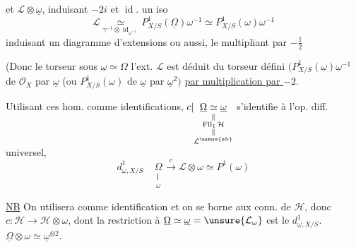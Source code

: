 et $\mathcal{L}\otimes\underline{\omega}$, induisant $-2i$ et $\operatorname{id}$.  un iso
\[
\mathcal{L}\underset{\gamma^{-1}\otimes\operatorname{id}_{\omega^{-1}}}{\simeq}P^1_{X/S}(\underline{\Omega})\omega^{-1}\simeq P^1_{X/S}(\omega)\omega^{-1}
\]
induisant un diagramme d'extensions
\margin{\textcircled{$\alpha$}}
ou aussi, le multipliant par $-\frac12$

(Donc le torseur sous $\underline{\omega}\simeq\Omega$  l'ext. $\mathcal{L}$ est déduit du torseur  défini  $(P^1_{X/S}(\underline{\omega})\underline{\omega}^{-1}$ de $\mathcal{O}_X$ par $\underline{\omega}$ (ou $P^1_{X/S}(\omega)$ de $\underline{\omega}$ par $\underline{\omega}^2)$ \uline{par multiplication par $-2$}.

Utilisant ces hom. comme identifications,
$c|\underset{\substack{\Vert\\\operatorname{Fil}_1\mathcal{H}\\\Vert\\\mathcal{L}^{\unsure{\mathrm{ab}}}}}{\underline{\Omega}\simeq\underline{\omega}}$ s'identifie à l'op. diff. universel,
\[
d^1_{\underline{\omega},X/S}\quad
\underset{\substack{\Vert\\\omega}}{\Omega}\xrightarrow{c}\mathcal{L}\otimes\omega\simeq P^1(\omega)
\]

\uline{NB} On utilisera  comme identification et on se borne aux conn. de $\mathcal{H}$, donc $c:\mathcal{H}\longrightarrow\mathcal{H}\otimes\omega$, dont la restriction à $\underline{\Omega}\simeq\underline{\omega}=\unsure{\mathcal{L}_{\omega}}$ est le $d^1_{\underline{\omega},X/S}$.
    $\underline{\Omega}\otimes\omega\simeq\underline{\omega}^{\otimes2}$.
